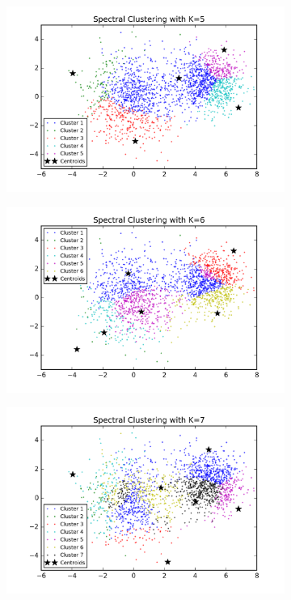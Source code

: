\begin{figure}[htb]
\begin{subfigure}[b]{0.475\textwidth}
            \includegraphics[width=\textwidth]{./figures/clustering_spectral_5.png}
        \end{subfigure}
        \hfill
        \begin{subfigure}[b]{0.475\textwidth}   
            \centering 
            \includegraphics[width=\textwidth]{./figures/clustering_spectral_6.png}
        \end{subfigure}
        \begin{subfigure}[b]{0.475\textwidth}   
            \centering 
            \includegraphics[width=\textwidth]{./figures/clustering_spectral_7.png}

\end{subfigure}
\end{figure}
